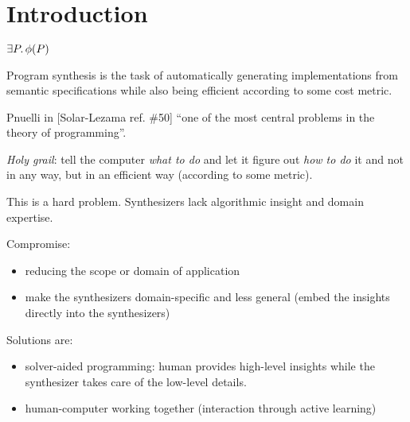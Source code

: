 \chapter{Introduction}
\label{chapter:introduction}

$\exists P \ldotp \phi(P) $

Program synthesis is the task of automatically generating implementations from
semantic specifications while also being efficient according to some cost metric.

Pnuelli in [Solar-Lezama ref. \#50] ``one of the most central problems in the
theory of programming''.

\textit{Holy grail}: tell the computer \textit{what to do} and let it figure out
\textit{how to do} it and not in any way, but in an efficient way (according to
some metric).

This is a hard problem. Synthesizers lack algorithmic insight and domain
expertise.

Compromise:

\begin{itemize}
\item reducing the scope or domain of application
\item make the synthesizers domain-specific and less general (embed the insights
  directly into the synthesizers)
\end{itemize}

Solutions are:

\begin{itemize}
\item solver-aided programming: human provides high-level insights while the
synthesizer takes care of the low-level details.
\item human-computer working together (interaction through active learning)
\end{itemize}









